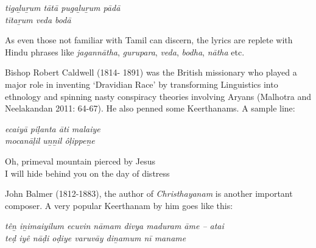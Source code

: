 \begin{myquote}
\textit{tigaḻuṟum tātā pugaḻuṟum pādā\\ tītaṟum veda bodā}
\end{myquote}

\begin{myquote}
\end{myquote}

As even those not familiar with Tamil can discern, the lyrics are replete with Hindu phrases like \textit{jagannātha}, \textit{gurupara}, \textit{veda}, \textit{bodha}, \textit{nātha} etc.

Bishop Robert Caldwell (1814- 1891) was the British missionary who played a major role in inventing ‘Dravidian Race’ by transforming Linguistics into ethnology and spinning nasty conspiracy theories involving Aryans (Malhotra and Neelakandan 2011: 64-67). He also penned some Keerthanams. A sample line:

\begin{myquote}
\textit{ecaiyā piḷanta āti malaiye\\ mocanāḷil uṉṉil ôḷippeṉe }
\end{myquote}

\begin{myquote}
\end{myquote}

\begin{myquote}
Oh, primeval mountain pierced by Jesus\\ I will hide behind you on the day of distress
\end{myquote}

John Balmer (1812-1883), the author of \textit{Christhayanam} is another important composer. A very popular Keerthanam by him goes like this:

\begin{myquote}
\textit{têṉ iṉimaiyilum ecuvin nāmam divya maduram āme – atai\\ teḍ iyê nāḍi oḍiye varuvāy diṉamum nī maname}
\end{myquote}

\begin{myquote}
\end{myquote}

